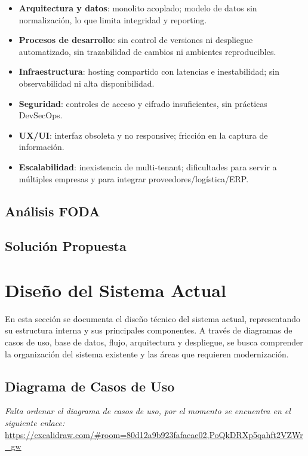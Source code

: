 \begin{itemize}
    \item \textbf{Arquitectura y datos}: monolito acoplado; modelo de datos sin normalización, lo que limita integridad y reporting.
    \item \textbf{Procesos de desarrollo}: sin control de versiones ni despliegue automatizado, sin trazabilidad de cambios ni ambientes reproducibles.
    \item \textbf{Infraestructura}: hosting compartido con latencias e inestabilidad; sin observabilidad ni alta disponibilidad.
    \item \textbf{Seguridad}: controles de acceso y cifrado insuficientes, sin prácticas DevSecOps.
    \item \textbf{UX/UI}: interfaz obsoleta y no responsive; fricción en la captura de información.
    \item \textbf{Escalabilidad}: inexistencia de multi-tenant; dificultades para servir a múltiples empresas y para integrar proveedores/logística/ERP.
\end{itemize}

\subsection{Análisis FODA}

\subsection{Solución Propuesta}

\section{Diseño del Sistema Actual}

En esta sección se documenta el diseño técnico del sistema actual, representando su estructura interna y sus principales componentes. A través de diagramas de casos de uso, base de datos, flujo, arquitectura y despliegue, se busca comprender la organización del sistema existente y las áreas que requieren modernización.


\subsection{Diagrama de Casos de Uso}

\textit{Falta ordenar el diagrama de casos de uso, por el momento se encuentra en el siguiente enlace:} \url{https://excalidraw.com/#room=80d12a9b923fafaeae02,PoQkDRXp5qahft2VZWr_gw}

